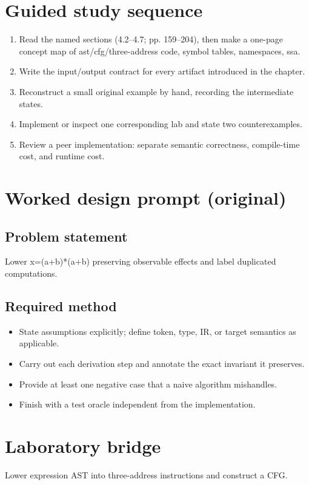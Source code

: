 \documentclass[10pt,letterpaper]{article}
\begin{document}
\section{Guided study sequence}
\begin{enumerate}
\item Read the named sections (4.2--4.7; pp. 159--204), then make a one-page concept map of ast/cfg/three-address code, symbol tables, namespaces, ssa.
\item Write the input/output contract for every artifact introduced in the chapter.
\item Reconstruct a small original example by hand, recording the intermediate states.
\item Implement or inspect one corresponding lab and state two counterexamples.
\item Review a peer implementation: separate semantic correctness, compile-time cost, and runtime cost.
\end{enumerate}

\section{Worked design prompt (original)}
\subsection{Problem statement}
Lower x=(a+b)*(a+b) preserving observable effects and label duplicated computations.
\subsection{Required method}
\begin{itemize}
\item State assumptions explicitly; define token, type, IR, or target semantics as applicable.
\item Carry out each derivation step and annotate the exact invariant it preserves.
\item Provide at least one negative case that a naive algorithm mishandles.
\item Finish with a test oracle independent from the implementation.
\end{itemize}


\section{Laboratory bridge}
Lower expression AST into three-address instructions and construct a CFG.
\end{document}
